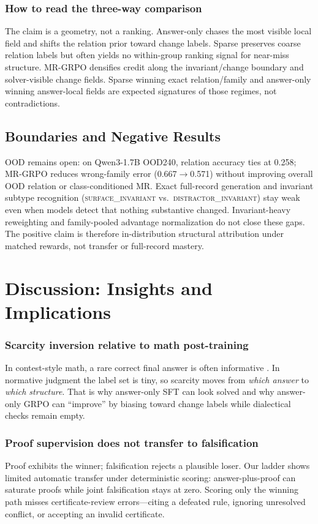 \documentclass[letterpaper]{article}
\newcommand{\method}{MR-GRPO}
\newcommand{\lab}[1]{\textsc{#1}}
\begin{document}
\subsubsection{How to read the three-way comparison}
The claim is a geometry, not a ranking. Answer-only chases the most visible local field and shifts the relation prior toward change labels. Sparse preserves coarse relation labels but often yields no within-group ranking signal for near-miss structure. \method{} densifies credit along the invariant/change boundary and solver-visible change fields. Sparse winning exact relation/family and answer-only winning answer-local fields are expected signatures of those regimes, not contradictions.

\subsection{Boundaries and Negative Results}

OOD remains open: on Qwen3-1.7B OOD240, relation accuracy ties at 0.258; \method{} reduces wrong-family error (0.667$\rightarrow$0.571) without improving overall OOD relation or class-conditioned MR. Exact full-record generation and invariant subtype recognition (\lab{surface\_invariant} vs.\ \lab{distractor\_invariant}) stay weak even when models detect that nothing substantive changed. Invariant-heavy reweighting and family-pooled advantage normalization do not close these gaps. The positive claim is therefore in-distribution structural attribution under matched rewards, not transfer or full-record mastery.

\section{Discussion: Insights and Implications}

\subsubsection{Scarcity inversion relative to math post-training}
In contest-style math, a rare correct final answer is often informative \cite{cobbe2021gsm8k,lightman2023letsverify,shao2024deepseekmath}. In normative judgment the label set is tiny, so scarcity moves from \emph{which answer} to \emph{which structure}. That is why answer-only SFT can look solved and why answer-only GRPO can ``improve'' by biasing toward change labels while dialectical checks remain empty.

\subsubsection{Proof supervision does not transfer to falsification}
Proof exhibits the winner; falsification rejects a plausible loser. Our ladder shows limited automatic transfer under deterministic scoring: answer-plus-proof can saturate proofs while joint falsification stays at zero. Scoring only the winning path misses certificate-review errors---citing a defeated rule, ignoring unresolved conflict, or accepting an invalid certificate.
\end{document}
